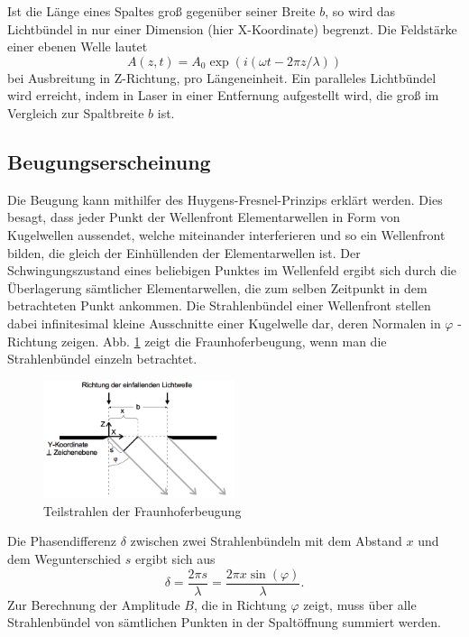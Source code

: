 Ist die Länge eines Spaltes groß gegenüber seiner Breite $b$, so wird das Lichtbündel
in nur einer Dimension (hier X-Koordinate) begrenzt. Die Feldstärke einer
ebenen Welle lautet
\begin{equation}
  A(z,t) = A_0 \exp{(i(\omega t - 2\pi z / \lambda))}
\end{equation}
bei Ausbreitung in Z-Richtung, pro Längeneinheit. Ein paralleles Lichtbündel wird
erreicht, indem in Laser in einer Entfernung aufgestellt wird, die groß im
Vergleich zur Spaltbreite $b$ ist.

\subsection{Beugungserscheinung}
Die Beugung kann mithilfer des Huygens-Fresnel-Prinzips erklärt werden. Dies besagt,
dass jeder Punkt der Wellenfront Elementarwellen in Form von Kugelwellen aussendet,
welche miteinander interferieren und so ein Wellenfront bilden, die gleich der
Einhüllenden der Elementarwellen ist. Der Schwingungszustand eines beliebigen Punktes
im Wellenfeld ergibt sich durch die Überlagerung sämtlicher Elementarwellen, die
zum selben Zeitpunkt in dem betrachteten Punkt ankommen. Die Strahlenbündel einer
Wellenfront stellen dabei infinitesimal kleine Ausschnitte einer Kugelwelle dar,
deren Normalen in $\varphi$ - Richtung zeigen.
Abb. \ref{fig:Fraunhofer} zeigt die Fraunhoferbeugung, wenn man die Strahlenbündel
einzeln betrachtet.
\begin{figure}
  \centering
  \includegraphics[width=0.5\textwidth]{bilder/Fraunhofer.png}
  \caption{Teilstrahlen der Fraunhoferbeugung \cite{406}}
  \label{fig:Fraunhofer}
\end{figure}
Die Phasendifferenz $\delta$ zwischen zwei Strahlenbündeln mit dem Abstand $x$
und dem Wegunterschied $s$ ergibt sich aus
\begin{equation}
  \delta = \frac{2 \pi s}{\lambda} = \frac{2 \pi x \sin{(\varphi)}}{\lambda}.
\end{equation}
Zur Berechnung der Amplitude $B$, die in Richtung $\varphi$ zeigt, muss über
alle Strahlenbündel von sämtlichen Punkten in der Spaltöffnung summiert werden.
